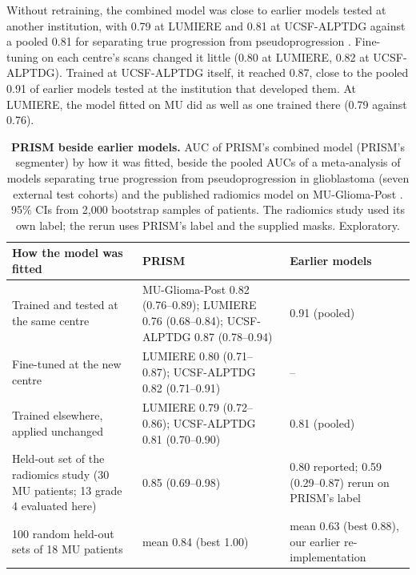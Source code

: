 \documentclass[largeformat]{interact} %
\begin{document}
Without retraining, the combined model was close to earlier models tested at another institution, with 0.79 at LUMIERE
and 0.81 at UCSF-ALPTDG against a pooled 0.81 for separating true progression from pseudoprogression
\citep{zhang2026meta}. Fine-tuning on each centre's scans changed it little (0.80 at LUMIERE,
0.82 at UCSF-ALPTDG). Trained at UCSF-ALPTDG itself, it reached 0.87, close to the pooled 0.91 of earlier models
tested at the institution that developed them. At LUMIERE, the model fitted on MU did as well as one trained there
(0.79 against 0.76).

\begin{table}[!htbp]
\centering
\caption[PRISM beside earlier models]{\textbf{PRISM beside earlier models.} AUC of PRISM's combined model (PRISM's
segmenter) by how it was fitted, beside the pooled AUCs of a meta-analysis of models separating true progression from pseudoprogression in
glioblastoma (seven external test cohorts) \citep{zhang2026meta} and
the published radiomics model on MU-Glioma-Post \citep{christodoulou2026}. 95\% CIs from 2,000 bootstrap samples of
patients. The radiomics study used its own label; the rerun uses PRISM's label and the supplied masks. Exploratory.}
\label{tab:lit}
\footnotesize
\zebrarows
\begin{tabularx}{\linewidth}{@{}LR{4.4cm}R{4.4cm}@{}}
\toprule
How the model was fitted & PRISM & Earlier models \\
\midrule
Trained and tested at the same centre & MU-Glioma-Post 0.82 (0.76--0.89); LUMIERE 0.76 (0.68--0.84); UCSF-ALPTDG 0.87 (0.78--0.94) & 0.91 (pooled) \\
Fine-tuned at the new centre & LUMIERE 0.80 (0.71--0.87); UCSF-ALPTDG 0.82 (0.71--0.91) & -- \\
Trained elsewhere, applied unchanged & LUMIERE 0.79 (0.72--0.86); UCSF-ALPTDG 0.81 (0.70--0.90) & 0.81 (pooled) \\
\addlinespace
Held-out set of the radiomics study (30 MU patients; 13 grade 4 evaluated here) & 0.85 (0.69--0.98) & 0.80 reported; 0.59 (0.29--0.87) rerun on PRISM's label \\
100 random held-out sets of 18 MU patients & mean 0.84 (best 1.00) & mean 0.63 (best 0.88), our earlier re-implementation \\
\bottomrule
\end{tabularx}
\end{table}
\end{document}
